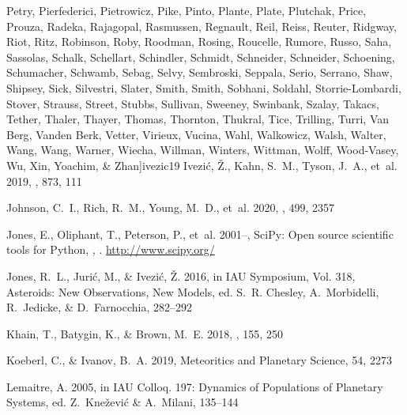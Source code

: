 \documentclass[twocolumn]{aastex62}
\begin{document}
\begin{thebibliography}{}
{  {Petry}, {Pierfederici}, {Pietrowicz}, {Pike}, {Pinto}, {Plante}, {Plate},
  {Plutchak}, {Price}, {Prouza}, {Radeka}, {Rajagopal}, {Rasmussen},
  {Regnault}, {Reil}, {Reiss}, {Reuter}, {Ridgway}, {Riot}, {Ritz}, {Robinson},
  {Roby}, {Roodman}, {Rosing}, {Roucelle}, {Rumore}, {Russo}, {Saha},
  {Sassolas}, {Schalk}, {Schellart}, {Schindler}, {Schmidt}, {Schneider},
  {Schneider}, {Schoening}, {Schumacher}, {Schwamb}, {Sebag}, {Selvy},
  {Sembroski}, {Seppala}, {Serio}, {Serrano}, {Shaw}, {Shipsey}, {Sick},
  {Silvestri}, {Slater}, {Smith}, {Smith}, {Sobhani}, {Soldahl},
  {Storrie-Lombardi}, {Stover}, {Strauss}, {Street}, {Stubbs}, {Sullivan},
  {Sweeney}, {Swinbank}, {Szalay}, {Takacs}, {Tether}, {Thaler}, {Thayer},
  {Thomas}, {Thornton}, {Thukral}, {Tice}, {Trilling}, {Turri}, {Van Berg},
  {Vanden Berk}, {Vetter}, {Virieux}, {Vucina}, {Wahl}, {Walkowicz}, {Walsh},
  {Walter}, {Wang}, {Wang}, {Warner}, {Wiecha}, {Willman}, {Winters},
  {Wittman}, {Wolff}, {Wood-Vasey}, {Wu}, {Xin}, {Yoachim}, \&
  {Zhan}}]{ivezic19}
{Ivezi{\'c}}, {\v{Z}}., {Kahn}, S.~M., {Tyson}, J.~A., {et~al.} 2019, \apj,
  873, 111

{Johnson}, C.~I., {Rich}, R.~M., {Young}, M.~D., {et~al.} 2020, \mnras, 499,
  2357

Jones, E., Oliphant, T., Peterson, P., {et~al.} 2001--, {SciPy}: Open source
  scientific tools for {Python}, , .
\newblock \url{http://www.scipy.org/}

{Jones}, R.~L., {Juri{\'c}}, M., \& {Ivezi{\'c}}, {\v{Z}}. 2016, in IAU
  Symposium, Vol. 318, Asteroids: New Observations, New Models, ed. S.~R.
  {Chesley}, A.~{Morbidelli}, R.~{Jedicke}, \& D.~{Farnocchia}, 282--292

{Khain}, T., {Batygin}, K., \& {Brown}, M.~E. 2018, \aj, 155, 250

{Koeberl}, C., \& {Ivanov}, B.~A. 2019, Meteoritics and Planetary Science, 54,
  2273

{Lemaitre}, A. 2005, in IAU Colloq. 197: Dynamics of Populations of Planetary
  Systems, ed. Z.~{Kne{\v{z}}evi{\'c}} \& A.~{Milani}, 135--144


\end{thebibliography}
\end{document}
